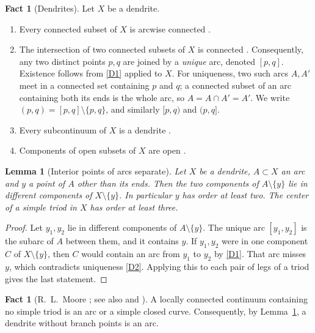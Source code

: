 \documentclass[11pt]{amsart}
\newtheorem{lemma}[theorem]{Lemma}
\theoremstyle{definition}
\newtheorem{fact}[theorem]{Fact}
\theoremstyle{remark}
\begin{document}
\begin{fact}[Dendrites]\label{fact:dendrite}
Let $X$ be a dendrite.
\begin{enumerate}[label=\textup{(D\arabic*)},leftmargin=*]
\item\label{D1} Every connected subset of $X$ is arcwise connected \cite[Proposition~10.9]{Nad92}.
\item\label{D2} The intersection of two connected subsets of $X$ is connected \cite[Theorem~10.10]{Nad92}. Consequently, any two distinct points $p,q$ are joined by a \emph{unique} arc, denoted $[p,q]$. Existence follows from \ref{D1} applied to $X$. For uniqueness, two such arcs $A,A'$ meet in a connected set containing $p$ and $q$; a connected subset of an arc containing both its ends is the whole arc, so $A=A\cap A'=A'$. We write $(p,q)=[p,q]\setminus\{p,q\}$, and similarly $[p,q)$ and $(p,q]$.
\item\label{D3} Every subcontinuum of $X$ is a dendrite \cite[Corollary~10.6]{Nad92}.
\item\label{D4} Components of open subsets of $X$ are open \cite[Theorem~25.3]{Mun00}.
\end{enumerate}
\end{fact}

\begin{lemma}[Interior points of arcs separate]\label{lem:separate}
Let $X$ be a dendrite, $A\subset X$ an arc and $y$ a point of $A$ other than its ends. Then the two components of $A\setminus\{y\}$ lie in different components of $X\setminus\{y\}$. In particular $y$ has order at least two. The center of a simple triod in $X$ has order at least three.
\end{lemma}
\begin{proof}
Let $y_1,y_2$ lie in different components of $A\setminus\{y\}$. The unique arc $[y_1,y_2]$ is the subarc of $A$ between them, and it contains $y$. If $y_1,y_2$ were in one component $C$ of $X\setminus\{y\}$, then $C$ would contain an arc from $y_1$ to $y_2$ by \ref{D1}. That arc misses $y$, which contradicts uniqueness \ref{D2}. Applying this to each pair of legs of a triod gives the last statement.
\end{proof}

\begin{fact}[R.~L.~Moore {\cite[Theorem~75, p.~218]{Moo62}}; see also {\cite[Lemma~3]{LW74}} and {\cite[Lemma~2.3]{L76b}}]\label{fact:notriod}
A locally connected continuum containing no simple triod is an arc or a simple closed curve. Consequently, by Lemma~\ref{lem:separate}, a dendrite without branch points is an arc.
\end{fact}
\end{document}
